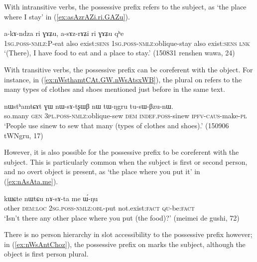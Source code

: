 With intransitive verbs, the possessive prefix refers to the subject, as  `the place where I stay' in (\ref{ex:asAzrAZi.ri.GAZu}).

\begin{exe}
\ex \label{ex:asAzrAZi.ri.GAZu}
\gll a-kɤ-ndza ri ɣɤʑu, a-sɤz-rɤʑi ri ɣɤʑu qʰe \\
\textsc{1sg}.\textsc{poss}-\textsc{nmlz}:P-eat also exist:\textsc{sens} \textsc{1sg}.\textsc{poss}-\textsc{nmlz}:oblique-stay also exist:\textsc{sens} \textsc{lnk} \\
\glt `(There), I have food to eat and a place to stay.' (150831 renshen wawa, 24)
\end{exe}

With transitive verbs, the possessive prefix can be coreferent with the object. For instance, in (\ref{ex:nWsthamtCAt.GW.nWsAtsxWB}), the plural  on  refers to the many types of clothes and shoes mentioned just before in the same text.

 \begin{exe}
\ex \label{ex:nWsthamtCAt.GW.nWsAtsxWB}
\gll nɯstʰamtɕɤt ɣɯ nɯ-sɤ-tʂɯβ nɯ tɯ-ŋgru tu-sɯ-βzu-nɯ.   \\
so.many \textsc{gen} \textsc{3pl}.\textsc{poss}-\textsc{nmlz}:oblique-sew \textsc{dem} \textsc{indef}.\textsc{poss}-sinew \textsc{ipfv}-\textsc{caus}-make-\textsc{pl} \\
\glt `People use sinew to sew that many (types of clothes and shoes).' (150906 tWNgru, 17)
\end{exe} 

However, it is also possible for the possessive prefix to be coreferent with the subject. This is particularly common when the subject is first or second person, and no overt object is present, as  `the place where you put it' in (\ref{ex:nAsAta.me}).
 
 \begin{exe}
\ex \label{ex:nAsAta.me}
\gll   kɯɕte nɯtɕu nɤ-sɤ-ta me ɯ́-ŋu \\
other \textsc{dem}:\textsc{loc} \textsc{2sg}.\textsc{poss}-\textsc{nmlz}:\textsc{obl}-put not.exist:\textsc{fact} \textsc{qu}-be:\textsc{fact} \\
\glt `Isn't there any other place where you put (the food)?' (meimei de gushi, 72)
 \end{exe} 

There is no person hierarchy in slot accessibility to the possessive prefix however; in (\ref{ex:nWsAntChoz}), the possessive prefix on  marks the subject, although the object is first person plural. 

